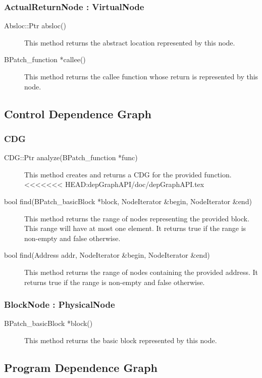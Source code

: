 \documentclass[12pt,titlepage]{article}
\begin{document}
\subsubsection{ActualReturnNode : VirtualNode}
\begin{description}
\item[Absloc::Ptr absloc()]
This method returns the abstract location represented by this node.
\item[BPatch\_function *callee() ]
This method returns the callee function whose return is represented by this node.
\end{description}

\subsection{Control Dependence Graph}
\subsubsection{CDG}
\begin{description}
\item[CDG::Ptr analyze(BPatch\_function *func)]
This method creates and returns a CDG for the provided function.
<<<<<<< HEAD:depGraphAPI/doc/depGraphAPI.tex
\item[bool find(BPatch\_basicBlock *block, NodeIterator \&begin, NodeIterator \&end)]
This method returns the range of nodes representing the provided
block. This range will have at most one element. It returns true if
the range is non-empty and false otherwise. 
\item[bool find(Address addr, NodeIterator \&begin, NodeIterator
\&end)] This method returns the range of nodes containing the provided
address. It returns true if the range is non-empty and false
otherwise.
\end{description}

\subsubsection{BlockNode : PhysicalNode}
\begin{description}
\item[BPatch\_basicBlock *block() ]
This method returns the basic block represented by this node. 
\end{description}

\subsection{Program Dependence Graph}
\end{document}
